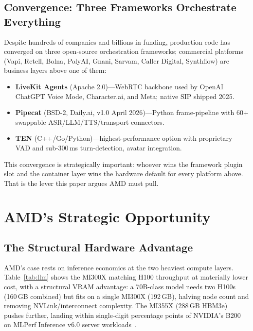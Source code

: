 \documentclass[blind]{gtac}
\begin{document}
\subsection{Convergence: Three Frameworks Orchestrate Everything}

Despite hundreds of companies and billions in funding, production code has converged on three open-source orchestration frameworks; commercial platforms (Vapi, Retell, Bolna, PolyAI, Gnani, Sarvam, Caller Digital, Synthflow) are business layers above one of them:

\begin{itemize}
  \item \textbf{LiveKit Agents} (Apache 2.0)---WebRTC backbone used by OpenAI ChatGPT Voice Mode, Character.ai, and Meta; native SIP shipped 2025.
  \item \textbf{Pipecat} (BSD-2, Daily.ai, v1.0 April 2026)---Python frame-pipeline with 60+ swappable ASR/LLM/TTS/transport connectors.
  \item \textbf{TEN} (C++/Go/Python)---highest-performance option with proprietary VAD and sub-300\,ms turn-detection, avatar integration.
\end{itemize}

This convergence is strategically important: whoever wins the framework plugin slot and the container layer wins the hardware default for every platform above. That is the lever this paper argues AMD must pull.

\section{AMD's Strategic Opportunity}
\label{sec:amd}

\subsection{The Structural Hardware Advantage}

AMD's case rests on inference economics at the two heaviest compute layers. Table~\ref{tab:llm} shows the MI300X matching H100 throughput at materially lower cost, with a structural VRAM advantage: a 70B-class model needs two H100s (160\,GB combined) but fits on a single MI300X (192\,GB), halving node count and removing NVLink/interconnect complexity. The MI355X (288\,GB HBM3e) pushes further, landing within single-digit percentage points of NVIDIA's B200 on MLPerf Inference v6.0 server workloads~\cite{mlperf6}.
\end{document}
